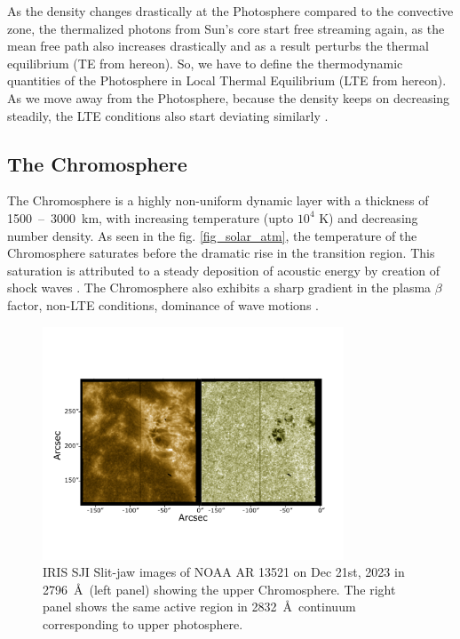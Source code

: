 As the density changes drastically at the Photosphere compared to the convective zone, the thermalized photons from Sun's core start free streaming again, as the mean free path also increases drastically and as a result perturbs the thermal equilibrium (TE from hereon). So, we have to define the thermodynamic quantities of the Photosphere in Local Thermal Equilibrium (LTE from hereon). As we move away from the Photosphere, because the density keeps on decreasing steadily, the LTE conditions also start deviating similarly \citep{philips08}.

\subsection{The Chromosphere}\label{chromosphere}

The Chromosphere is a highly non-uniform dynamic layer with a thickness of 1500~--~3000~km, with increasing temperature (upto $10^{4}$ K) and decreasing number density. As seen in the fig. \ref{fig_solar_atm}, the temperature of the Chromosphere saturates before the dramatic rise in the transition region. This saturation is attributed to a steady deposition of acoustic energy by creation of shock waves \citep{carlsson07}. The Chromosphere also exhibits a sharp gradient in the plasma $\beta$ factor, non-LTE conditions, dominance of wave motions . 

\begin{figure}[ht!]
    \centering
    \includegraphics[trim={1cm 3cm 2cm 5cm},clip,width=0.8\textwidth]{Figures/sji_images.pdf}
    \caption{IRIS SJI Slit-jaw images of NOAA AR 13521 on Dec 21st, 2023 in  2796~\AA~(left panel) showing the upper Chromosphere. The right panel shows the same active region in 2832~\AA~continuum corresponding to upper photosphere.}
    \label{fig:sji_features}
\end{figure}

